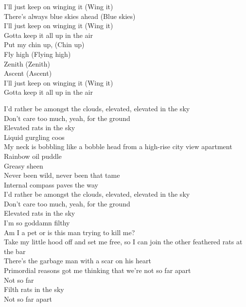 I'll just keep on winging it (Wing it)\\
There's always blue skies ahead (Blue skies)\\
I'll just keep on winging it (Wing it)\\
Gotta keep it all up in the air\\
Put my chin up, (Chin up)\\
Fly high (Flying high)\\
Zenith (Zenith)\\
Ascent (Ascent)\\
I'll just keep on winging it (Wing it)\\
Gotta keep it all up in the air\\



I'd rather be amongst the clouds, elevated, elevated in the sky\\
Don't care too much, yeah, for the ground\\
Elevated rats in the sky\\
Liquid gurgling coos\\
My neck is bobbling like a bobble head from a high-rise city view apartment\\
Rainbow oil puddle\\
Greasy sheen\\
Never been wild, never been that tame\\
Internal compass paves the way\\
I'd rather be amongst the clouds, elevated, elevated in the sky\\
Don't care too much, yeah, for the ground\\
Elevated rats in the sky\\

I'm so goddamn filthy\\
Am I a pet or is this man trying to kill me?\\
Take my little hood off and set me free, so I can join the other feathered rats at the bar\\
There's the garbage man with a scar on his heart\\
Primordial reasons got me thinking that we're not so far apart\\
Not so far\\
Filth rats in the sky\\
Not so far apart\\

